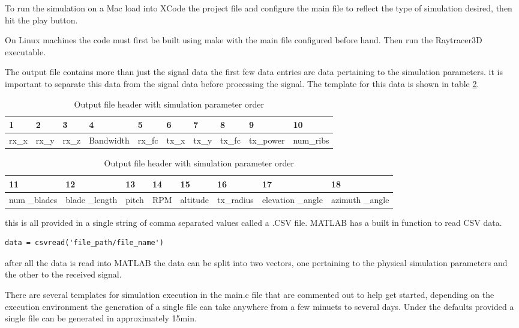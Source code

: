 To run the simulation on a Mac load into XCode the project file and configure the main file to reflect the type of simulation desired, then hit the play button.

On Linux machines the code must first be built using make with the main file configured before hand. Then run the Raytracer3D executable.

The output file contains more than just the signal data the first few data entries are data pertaining to the simulation parameters. it is important to separate this data from the signal data before processing the signal. The template for this data is shown in table 
\ref{tab:file_values}.

\begin{table}
\begin{center}
    \begin{tabular}{| l | l | l | l | l | l | l | l | l | l |}
    \hline
    1 & 2 & 3 & 4 & 5 & 6 & 7 & 8 & 9 & 10 \\ \hline
      rx\_x & rx\_y & rx\_z & Bandwidth & rx\_fc & tx\_x & tx\_y & tx\_fc & tx\_power & num\_ribs \\ \hline
    \end{tabular}
    \begin{tabular}{| p{1cm} | p{1cm} | l | l | l | l | p{1.5cm} | p{1.5cm} |}
    \hline
    11 & 12 & 13 & 14 & 15 & 16 & 17 & 18\\ \hline
     num \_blades & blade \_length & pitch & RPM & altitude & tx\_radius & elevation \_angle & azimuth \_angle \\ \hline
    \end{tabular}
     \caption{Output file header with simulation parameter order}
    \label{tab:file_values}
\end{center}
\end{table}

this is all provided in a single string of comma separated values called a .CSV file. MATLAB has a built in function to read CSV data.

\begin{lstlisting}
data = csvread('file_path/file_name')
\end{lstlisting}

after all the data is read into MATLAB the data can be split into two vectors, one pertaining to the physical simulation parameters and the other to the received signal.

There are several templates for simulation execution in the main.c file that are commented out to help get started, depending on the execution environment the generation of a single file can take anywhere from a few minuets to several days. Under the defaults provided a single file can be generated in approximately 15min.
 